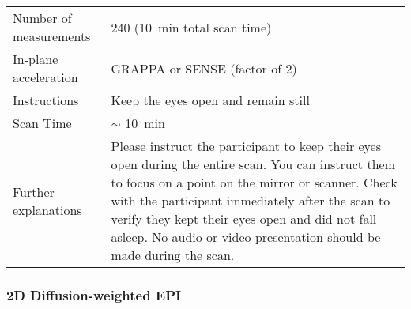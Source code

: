\begin{tabularx}{\linewidth}{@{} s | X @{}}
Number of measurements                            			& 240 (\SI{10}{\minute} total scan time)       	\\
In-plane acceleration                             				& GRAPPA or SENSE (factor of 2)               		\\
Instructions                                      					& Keep the eyes open and remain still         		\\
Scan Time                                         					& $\sim$ \SI{10}{\minute}					\\
Further explanations                              				& Please instruct the participant to keep their eyes open during the entire scan. You can instruct them to focus on a point on the mirror or scanner. Check with the participant immediately after the scan to verify they kept their eyes open and did not fall asleep. No audio or video presentation should be made during the scan.                                           
\end{tabularx}


\subsubsection{2D Diffusion-weighted EPI}

